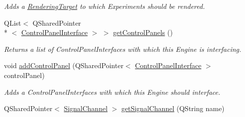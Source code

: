 \begin{DoxyCompactItemize}
\begin{DoxyCompactList}\small\item\em Adds a \hyperlink{struct_picto_1_1_rendering_target}{Rendering\-Target} to which Experiments should be rendered. \end{DoxyCompactList}\item 
Q\-List$<$ Q\-Shared\-Pointer\\*
$<$ \hyperlink{class_control_panel_interface}{Control\-Panel\-Interface} $>$ $>$ \hyperlink{class_picto_1_1_engine_1_1_picto_engine_a9556221b2f1f2dc0ebd2369589a5a48a}{get\-Control\-Panels} ()
\begin{DoxyCompactList}\small\item\em Returns a list of Control\-Panel\-Interfaces with which this Engine is interfacing. \end{DoxyCompactList}\item 
void \hyperlink{class_picto_1_1_engine_1_1_picto_engine_a002fedd15e78521f2cedb02182e6cf0b}{add\-Control\-Panel} (Q\-Shared\-Pointer$<$ \hyperlink{class_control_panel_interface}{Control\-Panel\-Interface} $>$ control\-Panel)
\begin{DoxyCompactList}\small\item\em Adds a Control\-Panel\-Interfaces with which this Engine should interface. \end{DoxyCompactList}\item 
\hypertarget{class_picto_1_1_engine_1_1_picto_engine_a897e81f932c7e798e3f9c9b95f7aa103}{Q\-Shared\-Pointer$<$ \hyperlink{class_picto_1_1_signal_channel}{Signal\-Channel} $>$ \hyperlink{class_picto_1_1_engine_1_1_picto_engine_a897e81f932c7e798e3f9c9b95f7aa103}{get\-Signal\-Channel} (Q\-String name)}\label{class_picto_1_1_engine_1_1_picto_engine_a897e81f932c7e798e3f9c9b95f7aa103}


\end{DoxyCompactItemize}
